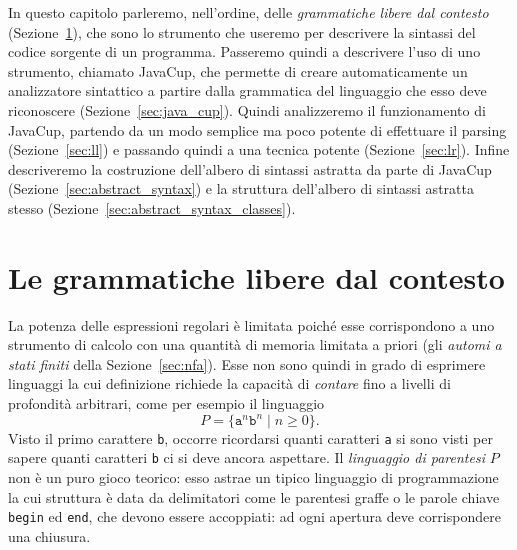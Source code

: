 In questo capitolo parleremo, nell'ordine, delle \emph{grammatiche libere
dal contesto} (Sezione~\ref{sec:grammar}), che sono lo strumento che useremo
per descrivere la sintassi del codice sorgente di un programma.
Passeremo quindi a descrivere l'uso di uno strumento,
chiamato JavaCup, che permette di creare automaticamente
un analizzatore sintattico a partire dalla grammatica del linguaggio
che esso deve riconoscere (Sezione~\ref{sec:java_cup}).
Quindi analizzeremo il funzionamento di JavaCup, partendo
da un modo semplice ma poco potente di effettuare il parsing
(Sezione~\ref{sec:ll}) e passando quindi a una tecnica \piu
potente (Sezione~\ref{sec:lr}). Infine descriveremo la costruzione
dell'albero di sintassi astratta da parte di JavaCup
(Sezione~\ref{sec:abstract_syntax}) e la struttura dell'albero
di sintassi astratta stesso (Sezione~\ref{sec:abstract_syntax_classes}).
%
\section{Le grammatiche libere dal contesto}\label{sec:grammar}
%
La potenza delle espressioni regolari \`e limitata poich\'e esse
corrispondono a uno strumento di calcolo con una quantit\`a di memoria
limitata a priori (gli \emph{automi a stati finiti} della
Sezione~\ref{sec:nfa}). Esse non sono quindi in grado di esprimere
linguaggi la cui definizione richiede la capacit\`a di \emph{contare}
fino a livelli di profondit\`a arbitrari, come per esempio il linguaggio
%
\[
  P=\{\mathtt{a}^n\mathtt{b}^n\mid n\ge 0\}.
\]
Visto il primo carattere \texttt{b}, occorre ricordarsi quanti caratteri
\texttt{a} si sono visti per sapere quanti caratteri \texttt{b}
ci si deve ancora aspettare. Il \emph{linguaggio di parentesi} $P$ non \`e
un puro gioco teorico: esso astrae un tipico linguaggio di programmazione
la cui struttura \`e data da delimitatori come le parentesi graffe
o le parole chiave \texttt{begin} ed \texttt{end}, che devono essere
accoppiati: ad ogni apertura deve corrispondere una chiusura.

